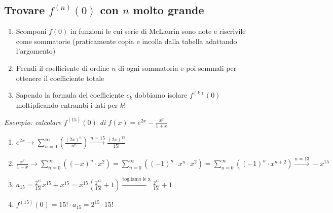 \documentclass[10pt, a4paper]{article}
\begin{document}
    \subsection{Trovare $f^{(n)}(0)$ con $n$ molto grande}
        \begin{enumerate}
            \item Scomponi $f(0)$ in funzioni le cui serie di McLaurin sono note e riscrivile come sommatorie (praticamente copia e incolla dalla tabella adattando l'argomento)
            \item Prendi il coefficiente di ordine $n$ di ogni sommatoria e poi sommali per ottenere il coefficiente totale
            \item Sapendo la formula del coefficiente $c_k$ dobbiamo isolare $f^{(k)}(0)$ moltiplicando entrambi i lati per $k!$
        \end{enumerate}
        \textit{Esempio: calcolare $f^{(15)}(0)$ di $f(x)=e^{2x}-\frac{x^2}{1+x}$}
        \begin{enumerate}
            \item $e^{2x}\rightarrow\sum_{n=0}^{\infty}\left(\frac{(2x)^n}{n!}\right)\xrightarrow{n=15}\frac{(2x)^{15}}{15!}$
            \item $\frac{x^2}{1+x}\rightarrow\sum_{n=0}^{\infty}\left((-x)^n\cdot x^2\right)=\sum_{n=0}^{\infty}\left((-1)^n\cdot x^n\cdot x^2\right)=\sum_{n=0}^{\infty}\left((-1)^n\cdot x^{n+2}\right)\xrightarrow{n=13} -x^{15}$
            \item $a_{15}=\frac{2^{15}}{15!}x^{15}+x^{15}=x^{15}\left(\frac{2^{15}}{15!}+1\right)\xrightarrow{\text{togliamo le x}} \frac{2^{15}}{15!}+1$
            \item $f^{(15)}(0)=15!\cdot a_{15}=2^{15}\cdot 15!$
        \end{enumerate}
\end{document}
